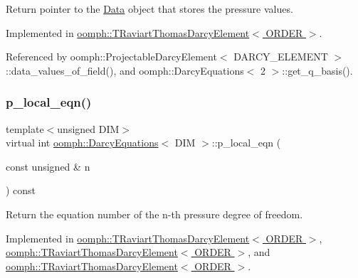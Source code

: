 Return pointer to the \hyperlink{classoomph_1_1Data}{Data} object that stores the pressure values. 



Implemented in \hyperlink{classoomph_1_1TRaviartThomasDarcyElement_a2cd258057e61232e3e29238faae7d315}{oomph\+::\+T\+Raviart\+Thomas\+Darcy\+Element$<$ O\+R\+D\+E\+R $>$}.



Referenced by oomph\+::\+Projectable\+Darcy\+Element$<$ D\+A\+R\+C\+Y\+\_\+\+E\+L\+E\+M\+E\+N\+T $>$\+::data\+\_\+values\+\_\+of\+\_\+field(), and oomph\+::\+Darcy\+Equations$<$ 2 $>$\+::get\+\_\+q\+\_\+basis().

\mbox{\label{classoomph_1_1DarcyEquations_a3eee8ba9fd2256d01c4be1141a5d6eb1}} 
\subsubsection{\texorpdfstring{p\+\_\+local\+\_\+eqn()}{p\_local\_eqn()}}
{\footnotesize\ttfamily template$<$unsigned D\+IM$>$ \\
virtual int \hyperlink{classoomph_1_1DarcyEquations}{oomph\+::\+Darcy\+Equations}$<$ D\+IM $>$\+::p\+\_\+local\+\_\+eqn (\begin{DoxyParamCaption}\item[{const unsigned \&}]{n }\end{DoxyParamCaption}) const\hspace{0.3cm}{\ttfamily [pure virtual]}}



Return the equation number of the n-\/th pressure degree of freedom. 



Implemented in \hyperlink{classoomph_1_1TRaviartThomasDarcyElement_a61ab9a21f152902ddd1869cd2c358602}{oomph\+::\+T\+Raviart\+Thomas\+Darcy\+Element$<$ O\+R\+D\+E\+R $>$}, \hyperlink{classoomph_1_1TRaviartThomasDarcyElement_a2ecb4c8ab08c0a21dbbf3afbf1101fbf}{oomph\+::\+T\+Raviart\+Thomas\+Darcy\+Element$<$ O\+R\+D\+E\+R $>$}, and \hyperlink{classoomph_1_1TRaviartThomasDarcyElement_af52ce439c8374c3396bb0e7f7a532ca8}{oomph\+::\+T\+Raviart\+Thomas\+Darcy\+Element$<$ O\+R\+D\+E\+R $>$}.




